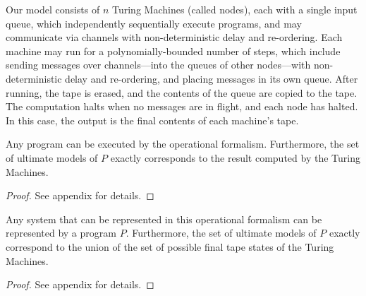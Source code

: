 
Our model consists of $n$ Turing Machines (called nodes), each with a single input queue, which independently sequentially execute programs, and may communicate via channels with non-deterministic delay and re-ordering.  Each machine may run for a polynomially-bounded number of steps, which include sending messages over channels---into the queues of other nodes---with non-deterministic delay and re-ordering, and placing messages in its own queue.  After running, the tape is erased, and the contents of the queue are copied to the tape.   The computation halts when no messages are in flight, and each node has halted.  In this case, the output is the final contents of each machine's tape.

\begin{lemma}
\label{lem:dedalus2turing}
Any \lang program can be executed by the operational formalism.  Furthermore, the set of ultimate models of $P$ exactly corresponds to the result computed by the Turing Machines.
\end{lemma}
\begin{proof}
See appendix for details.
\end{proof}

\begin{lemma}
\label{lem:turing2dedalus}
Any system that can be represented in this operational formalism can be represented by a \lang program $P$.  Furthermore, the set of ultimate models of $P$ exactly correspond to the union of the set of possible final tape states of the Turing Machines.
\end{lemma}
\begin{proof}
See appendix for details.
\end{proof}


